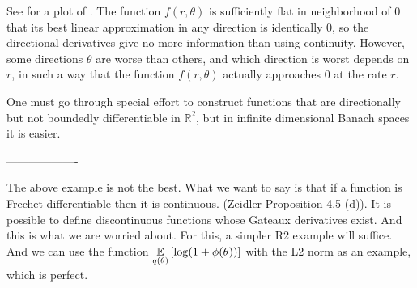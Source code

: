 
See  for a plot of .  The function $f(r,
\theta)$ is sufficiently flat in neighborhood of $0$ that its best linear
approximation in any direction is identically $0$, so the directional
derivatives give no more information than using continuity. However, some
directions $\theta$ are worse than others, and which direction is worst depends
on $r$, in such a way that the function $f(r, \theta)$ actually approaches $0$
at the rate $r$.

One must go through special effort to construct functions that are
directionally but not boundedly differentiable in $\mathbb{R}^2$, but in
infinite dimensional Banach spaces it is easier.



-------------------

The above example is not the best.  What we want to say is that if a function is
Frechet differentiable then it is continuous.  (Zeidler Proposition 4.5 (d)). It
is possible to define discontinuous functions whose Gateaux derivatives exist.
And this is what we are worried about.  For this, a simpler R2 example will
suffice.  And we can use the function $\underset{q(\theta)}{\mathbb{E}}\left[\log(1 +
\phi(\theta))\right]$ with the L2 norm as an example, which is perfect.

